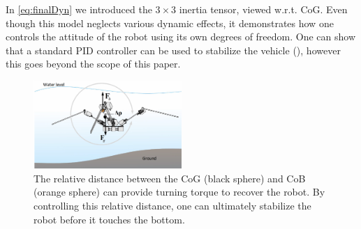 In \eqref{eq:finalDyn} we introduced the $3 \times 3$ inertia tensor, viewed w.r.t. CoG. Even though this model neglects various dynamic effects, it demonstrates how one controls the attitude of the robot using its own degrees of freedom. One can show that a standard PID controller can be used to stabilize the vehicle (\cite{Haus2017}), however this goes beyond the scope of this paper.

\begin{figure}
	\centering
	\includegraphics[width=0.5\textwidth]{./img/RestoreTorque.pdf}
	\caption{The relative distance between the CoG (black sphere) and CoB (orange sphere) can provide turning torque to recover the robot. By controlling this relative distance, one can ultimately stabilize the robot before it touches the bottom. }
	\label{fig:RestoreTorque}
\end{figure}